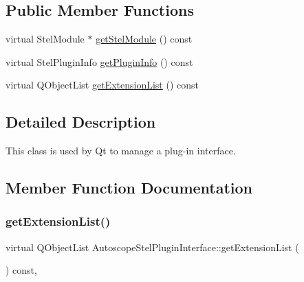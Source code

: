 \subsection*{Public Member Functions}
\begin{DoxyCompactItemize}
\item 
virtual Stel\+Module $\ast$ \mbox{\hyperlink{class_autoscope_stel_plugin_interface_a681456cfd440703d70f3fbf1b5a07887}{get\+Stel\+Module}} () const
\item 
virtual Stel\+Plugin\+Info \mbox{\hyperlink{class_autoscope_stel_plugin_interface_a22c9f313b39683d3ec45523ac5cbc4e7}{get\+Plugin\+Info}} () const
\item 
virtual Q\+Object\+List \mbox{\hyperlink{class_autoscope_stel_plugin_interface_ad9cba957b6ed14aa666e18671881862a}{get\+Extension\+List}} () const
\end{DoxyCompactItemize}


\subsection{Detailed Description}
This class is used by Qt to manage a plug-\/in interface. 

\subsection{Member Function Documentation}
\mbox{\label{class_autoscope_stel_plugin_interface_ad9cba957b6ed14aa666e18671881862a}} 
\subsubsection{\texorpdfstring{getExtensionList()}{getExtensionList()}}
{\footnotesize\ttfamily virtual Q\+Object\+List Autoscope\+Stel\+Plugin\+Interface\+::get\+Extension\+List (\begin{DoxyParamCaption}{ }\end{DoxyParamCaption}) const\hspace{0.3cm}{\ttfamily [inline]}, {\ttfamily [virtual]}}

\mbox{\label{class_autoscope_stel_plugin_interface_a22c9f313b39683d3ec45523ac5cbc4e7}} 
